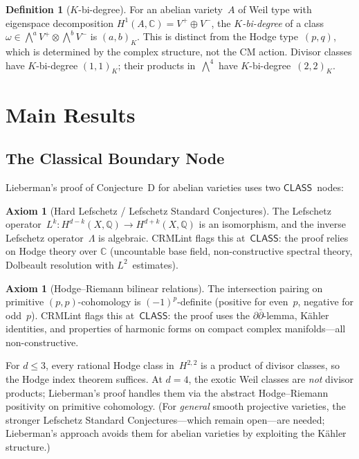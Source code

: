 \documentclass[11pt]{article}
\theoremstyle{plain}
\theoremstyle{definition}
\newtheorem{definition}[theorem]{Definition}
\newtheorem{axiombox}[theorem]{Axiom}
\theoremstyle{remark}
\newcommand{\Q}{\mathbb{Q}}
\newcommand{\C}{\mathbb{C}}
\newcommand{\CLASS}{\mathsf{CLASS}}
\begin{document}
\begin{definition}[$K$-bi-degree]
\label{def:kbideg}
For an abelian variety~$A$ of Weil type with eigenspace decomposition
$H^1(A,\C) = V^+ \oplus V^-$, the \emph{$K$-bi-degree} of a class
$\omega \in \bigwedge^a V^+ \otimes \bigwedge^b V^-$ is $(a,b)_K$.
This is distinct from the Hodge type~$(p,q)$, which is determined by the
complex structure, not the CM action.  Divisor classes have $K$-bi-degree
$(1,1)_K$; their products in~$\bigwedge^4$ have $K$-bi-degree~$(2,2)_K$.
\end{definition}


\section{Main Results}
\label{sec:main}

\subsection{The Classical Boundary Node}
\label{sec:cbn}

Lieberman's proof of Conjecture~D for abelian varieties uses two
$\CLASS$~nodes:

\begin{axiombox}[Hard Lefschetz / Lefschetz Standard Conjectures]
\label{ax:lefschetz}
The Lefschetz operator~$L^k : H^{d-k}(X,\Q) \to H^{d+k}(X,\Q)$ is an
isomorphism, and the inverse Lefschetz operator~$\Lambda$ is algebraic.
CRMLint flags this at~$\CLASS$: the proof relies on Hodge theory over
$\C$ (uncountable base field, non-constructive spectral theory, Dolbeault
resolution with $L^2$~estimates).
\end{axiombox}

\begin{axiombox}[Hodge--Riemann bilinear relations]
\label{ax:HR}
The intersection pairing on primitive $(p,p)$-cohomology is
$(-1)^{p}$-definite (positive for even~$p$, negative for odd~$p$).
CRMLint flags this at~$\CLASS$: the proof
uses the $\partial\bar\partial$-lemma, K\"ahler identities, and properties
of harmonic forms on compact complex manifolds---all non-constructive.
\end{axiombox}

For $d \leq 3$, every rational Hodge class in~$H^{2,2}$ is a product of
divisor classes, so the Hodge index theorem suffices.
At $d = 4$, the exotic Weil classes are \emph{not} divisor products;
Lieberman's proof handles them via the abstract Hodge--Riemann positivity
on primitive cohomology.  (For \emph{general} smooth projective varieties,
the stronger Lefschetz Standard Conjectures---which remain open---are
needed; Lieberman's approach avoids them for abelian varieties by exploiting
the K\"ahler structure.)
\end{document}
